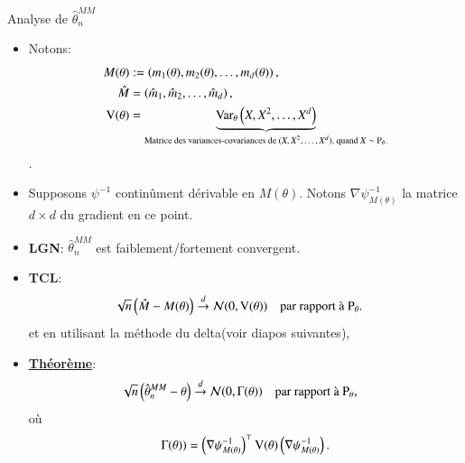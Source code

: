 \begin{frame}
    [allowframebreaks]{Analyse de $\hat{\theta}_n^{MM}$}\begin{itemize}
        \item Notons: \begin{align*}
            M(\theta) &:= \left(m_1(\theta), m_2(\theta), \ldots, m_d(\theta)\right),\\
            \hat{M} &=\left(\hat{m}_1, \hat{m}_2, \ldots, \hat{m}_d \right),\\
            \operatorname{V}(\theta) &=\underbrace{\operatorname{Var}_{\theta}\left(X, X^2, \ldots, X^d\right)}_{\text{Matrice des variances-covariances de $(X, X^2, \ldots, X^d)$, quand $X\sim\operatorname{P}_\theta$.}}
        \end{align*}.
        \item Supposons $\psi^{-1}$ continûment dérivable en $M(\theta)$. Notons $\nabla\psi^{-1}_{M(\theta)}$ la matrice $d\times d$ du gradient en ce point.
        \framebreak 
        \item \textbf{LGN}: $\hat{\theta}_n^{MM}$ est faiblement/fortement convergent.
        \item \textbf{TCL}: \begin{align*}
            \sqrt{n}\left(\hat{M}- M(\theta)\right)&\overset{d}{\rightarrow} \mathcal{N}(0, \operatorname{V}(\theta)) \quad \text{par rapport à $\operatorname{P}_\theta$.}
        \end{align*}
        et en utilisant la méthode du delta(voir diapos suivantes),
        \framebreak
        \item \textbf{\underline{Théorème}}:\begin{align*}
            \sqrt{n}\left(\hat{\theta}^{MM}_n - \theta\right) &\overset{d}{\rightarrow}\mathcal{N}(0, \Gamma(\theta)) \quad \text{par rapport à $\operatorname{P}_\theta$},
        \end{align*}
        où \begin{align*}
            \Gamma(\theta)) = \left(\nabla\psi^{-1}_{M(\theta)}\right)^\top \operatorname{V}(\theta)\left(\nabla\psi^{-1}_{M(\theta)}\right).
        \end{align*}
    \end{itemize}
\end{frame}

